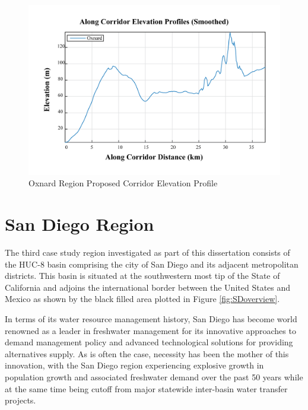         \begin{figure}[!h]
            \begin{center}
            \includegraphics[width=5.5in]{figures/Oxnard_Elevation_Profile.png}
            \caption{Oxnard Region Proposed Corridor Elevation Profile}
            \label{fig:OelevationProfile}
            \end{center}
        \end{figure}   
    
\clearpage    
    
\section{San Diego Region}

The third case study region investigated as part of this dissertation consists of the HUC-8 basin comprising the city of San Diego and its adjacent metropolitan districts. This basin is situated at the southwestern most tip of the State of California and adjoins the international border between the United States and Mexico as shown by the black filled area plotted in Figure \ref{fig:SDoverview}.

In terms of its water resource management history, San Diego has become world renowned as a leader in freshwater management for its innovative approaches to demand management policy and advanced technological solutions for providing alternatives supply. As is often the case, necessity has been the mother of this innovation, with the San Diego region experiencing explosive growth in population growth and associated freshwater demand over the past 50 years while at the same time being cutoff from major statewide inter-basin water transfer projects.

